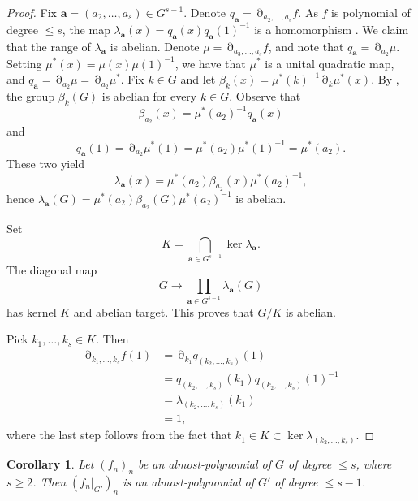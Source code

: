 \documentclass[a4paper,12pt]{amsart}
\theoremstyle{plain}
\newtheorem{corollary}[subsection]{{\bf Corollary}}
\theoremstyle{definition}
\theoremstyle{remark}
\numberwithin{equation}{subsection}
\DeclareMathOperator{\mypartial}{\partial}
\begin{document}
\begin{proof}
    Fix $\mathbf{a}=(a_2,\ldots ,a_s)\in G^{s-1}$. Denote $q_{\mathbf{a}}=\mypartial_{a_2,\ldots ,a_s}f$. As $f$ is polynomial of degree $\le s$, the map
    $\lambda_{\mathbf{a}}(x)=q_{\mathbf{a}}(x)q_{\mathbf{a}}(1)^{-1}$ is a homomorphism \cite[Lemma 2.1]{JT24}. We claim that the range of $\lambda_{\mathbf{a}}$ is abelian. Denote $\mu=\mypartial_{a_3,\ldots ,a_s}f$, and note that $q_{\mathbf{a}}=\mypartial_{a_2}\mu$. Setting $\mu^*(x)=\mu(x)\mu(1)^{-1}$, we have that $\mu^*$ is a unital quadratic map, and $q_{\mathbf{a}}=\mypartial_{a_2}\mu=\mypartial_{a_2}\mu^*$. Fix $k\in G$ and let $\beta_k(x)=\mu^*(k)^{-1}\mypartial_k\mu^*(x)$. By \cite[Proposition 2.4]{JT24}, the group $\beta_k(G)$ is abelian for every $k\in G$. Observe that
    $$\beta_{a_2}(x)=\mu^*(a_2)^{-1}q_{\mathbf{a}}(x)$$
    and 
    $$q_{\mathbf{a}}(1)=\mypartial_{a_2}\mu^*(1)=\mu^*(a_2)\mu^*(1)^{-1}=\mu^*(a_2).$$ 
    These two yield
    $$\lambda_{\mathbf{a}}(x)=\mu^*(a_2)\beta_{a_2}(x)\mu^*(a_2)^{-1},$$
    hence $\lambda_{\mathbf{a}}(G)=\mu^*(a_2)\beta_{a_2}(G)\mu^*(a_2)^{-1}$
    is abelian.

    Set
    $$K=\bigcap_{\mathbf{a}\in G^{s-1}}\ker\lambda_{\mathbf{a}}.$$
    The diagonal map
    $$G\to \prod_{\mathbf{a}\in G^{s-1}}\lambda_{\mathbf{a}}(G)$$
    has kernel $K$ and abelian target. This proves that $G/K$ is abelian.

    Pick $k_1,\ldots ,k_s\in K$. Then
    \begin{align*}
        \mypartial_{k_1,\ldots ,k_s}f(1) &= \mypartial_{k_1}q_{(k_2,\ldots ,k_s)}(1)\\
        &= q_{(k_2,\ldots ,k_s)}(k_1)q_{(k_2,\ldots ,k_s)}(1)^{-1}\\
        &= \lambda_{(k_2,\ldots ,k_s)}(k_1)\\
        &= 1,
    \end{align*}
    where the last step follows from the fact that $k_1\in K\subset\ker \lambda_{(k_2,\ldots ,k_s)}$.
\end{proof}

\begin{corollary}
    \label{cor:degreelowalmost}
    Let $(f_n)_n$ be an almost-polynomial of $G$ of degree $\le s$, where $s\ge 2$. Then $(f_n\big|_{G'})_n$ is an almost-polynomial of $G'$ of degree $\le s-1$.
\end{corollary}
\end{document}
